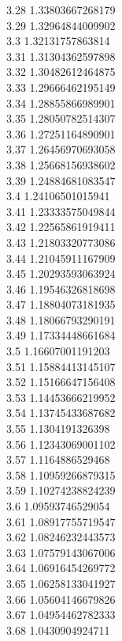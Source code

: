 {3.28	1.33803667268179\\
3.29	1.32964844009902\\
3.3	1.32131757863814\\
3.31	1.31304362597898\\
3.32	1.30482612464875\\
3.33	1.29666462195149\\
3.34	1.28855866989901\\
3.35	1.28050782514307\\
3.36	1.27251164890901\\
3.37	1.26456970693058\\
3.38	1.25668156938602\\
3.39	1.24884681083547\\
3.4	1.24106501015941\\
3.41	1.23333575049844\\
3.42	1.22565861919411\\
3.43	1.21803320773086\\
3.44	1.21045911167909\\
3.45	1.20293593063924\\
3.46	1.19546326818698\\
3.47	1.18804073181935\\
3.48	1.18066793290191\\
3.49	1.17334448661684\\
3.5	1.16607001191203\\
3.51	1.15884413145107\\
3.52	1.15166647156408\\
3.53	1.14453666219952\\
3.54	1.13745433687682\\
3.55	1.1304191326398\\
3.56	1.12343069001102\\
3.57	1.1164886529468\\
3.58	1.10959266879315\\
3.59	1.10274238824239\\
3.6	1.09593746529054\\
3.61	1.08917755719547\\
3.62	1.08246232443573\\
3.63	1.07579143067006\\
3.64	1.06916454269772\\
3.65	1.06258133041927\\
3.66	1.05604146679826\\
3.67	1.04954462782333\\
3.68	1.0430904924711\\
}
